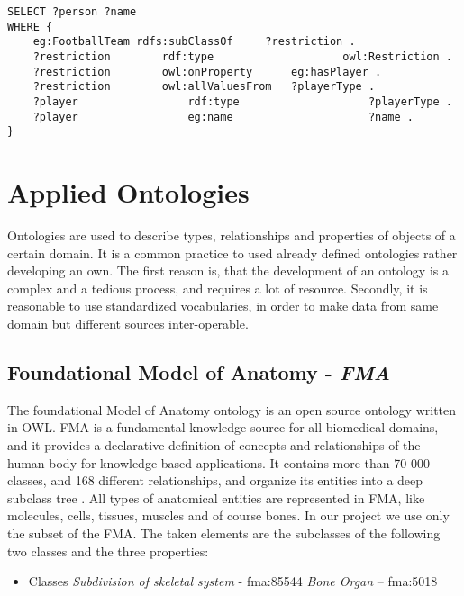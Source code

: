 \begin{lstlisting}[captionpos=b, caption=SPARQL Query III., label=3rd:sparql, belowskip=1em, aboveskip=2em,
basicstyle=\footnotesize,frame=single]
SELECT ?person ?name
WHERE {
	eg:FootballTeam	rdfs:subClassOf		?restriction .
	?restriction		rdf:type					owl:Restriction .
	?restriction		owl:onProperty		eg:hasPlayer .
	?restriction		owl:allValuesFrom	?playerType .
	?player					rdf:type					?playerType .
	?player					eg:name						?name . 
}
\end{lstlisting}

\newpage
\section{Applied Ontologies} \label{22}

Ontologies are used to describe types, relationships and properties of objects of a certain domain. It is a common practice to used already defined 
ontologies rather developing an own. The first reason is, that the development of an ontology is a complex and a tedious process, and requires a lot of resource. Secondly, it is reasonable to use standardized vocabularies, in order to make data from same domain but different sources inter-operable.

\subsection{Foundational Model of Anatomy - \textit{FMA}}  \label{fma}

The foundational Model of Anatomy ontology is an open source ontology written in OWL. FMA is a fundamental knowledge source for all biomedical domains, and it provides a declarative definition of concepts and relationships of the human body for knowledge based applications. It contains more than 70 000 classes, and 168 different relationships, and organize its entities into a deep subclass tree \cite{Rosse2003478}. All types of anatomical entities are represented in FMA, like molecules, cells, tissues, muscles and of course bones. In our project we use only the subset of the FMA. The taken elements are the subclasses of the following two classes and the three properties: 

\begin{itemize}
	\item{Classes}
		\subitem \textit{Subdivision of skeletal system} - fma:85544 
		\subitem \textit{Bone Organ} – fma:5018
\end{itemize}

